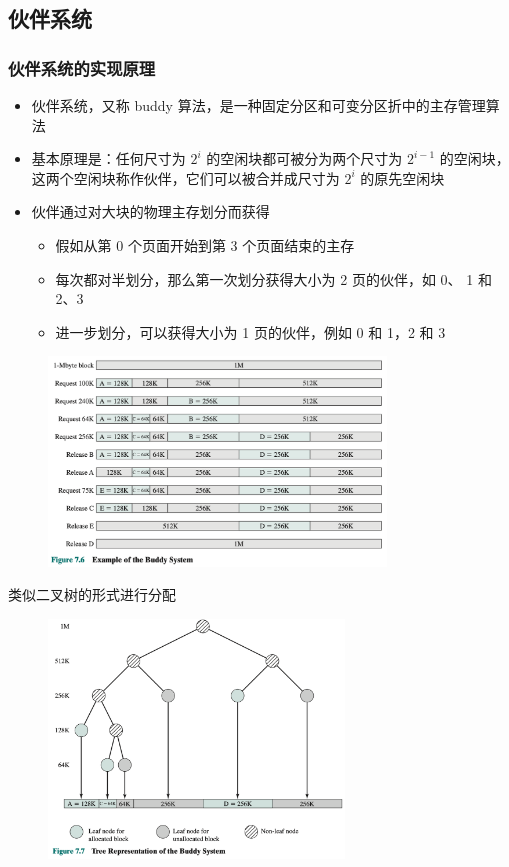 \documentclass[cs4size,a4paper,10pt]{ctexart}
\begin{document}
		\subsection{伙伴系统}
		\subsubsection{伙伴系统的实现原理}
		\begin{itemize}
			\item 伙伴系统，又称 buddy 算法，是一种固定分区和可变分区折中的主存管理算法
			\item 基本原理是：任何尺寸为 $2^i$ 的空闲块都可被分为两个尺寸为 $2^{i-1}$ 的空闲块，这两个空闲块称作伙伴，它们可以被合并成尺寸为 $2^i$ 的原先空闲块
			\item 伙伴通过对大块的物理主存划分而获得
			\begin{itemize}
				\item 假如从第 0 个页面开始到第 3 个页面结束的主存
				\item 每次都对半划分，那么第一次划分获得大小为 2 页的伙伴，如 0、 1 和 2、3
				\item 进一步划分，可以获得大小为 1 页的伙伴，例如 0 和 1，2 和 3
			\end{itemize}
		\end{itemize}
		\begin{figure}[H]
			\centering
			\includegraphics[width=0.8\textwidth]{img/3.2.4.1}
		\end{figure}

		类似二叉树的形式进行分配
		\begin{figure}[H]
			\centering
			\includegraphics[width=0.7\textwidth]{img/3.2.4.2}
		\end{figure}
\end{document}
